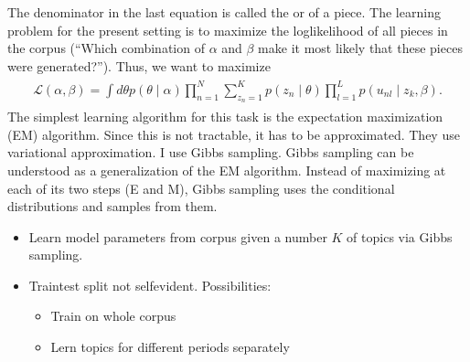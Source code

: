 \documentclass[letterpaper,10pt,english]{sphinxmanual}
\begin{document}
\sphinxAtStartPar
The denominator in the last equation is called the  or  of a piece. The learning problem for the
present setting is to maximize the log\sphinxhyphen{}likelihood of all pieces in the
corpus (“Which combination of \(\alpha\) and \(\beta\) make it
most likely that these pieces were generated?”). Thus, we want to
maximize
\begin{equation*}
\begin{split}\begin{aligned}
\mathcal L(\alpha, \beta) = \int d\theta p(\theta \mid \alpha) \prod_{n=1}^N \sum_{z_n=1}^K p(z_n \mid \theta) \prod_{l=1}^L p(u_{nl}\mid z_k, \beta).\end{aligned}\end{split}
\end{equation*}
\sphinxAtStartPar
The simplest learning algorithm for this task is the expectation
maximization (EM) algorithm. Since this is not tractable, it has to be
approximated. They use variational approximation. I use Gibbs sampling.
Gibbs sampling can be understood as a generalization of the EM
algorithm. Instead of maximizing at each of its two steps (E and M),
Gibbs sampling uses the conditional distributions and samples from them.
\begin{itemize}
\item {} 
\sphinxAtStartPar
Learn model parameters from corpus given a number \(K\) of topics
via Gibbs sampling.

\item {} 
\sphinxAtStartPar
Train\sphinxhyphen{}test split not self\sphinxhyphen{}evident. Possibilities:
\begin{itemize}
\item {} 
\sphinxAtStartPar
Train on whole corpus

\item {} 
\sphinxAtStartPar
Lern topics for different periods separately

\end{itemize}

\end{itemize}
\end{document}
